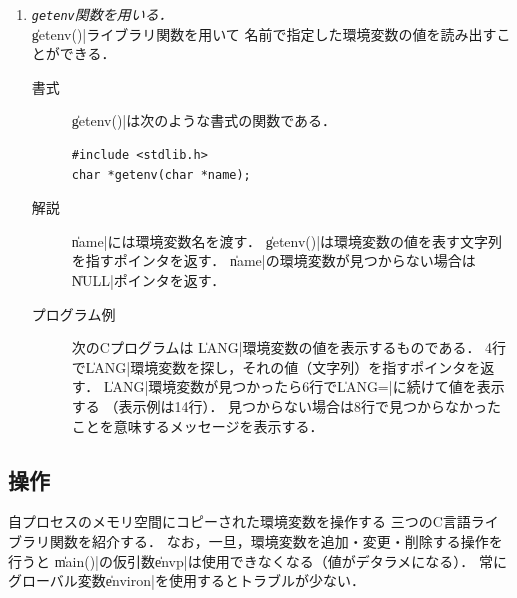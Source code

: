 \begin{enumerate}
\item \emph{\texttt{getenv}関数を用いる．} \\
  \|getenv()|ライブラリ関数を用いて
  名前で指定した環境変数の値を読み出すことができる．

  \begin{description}
  \item [書式] \|getenv()|は次のような書式の関数である．

\begin{lstlisting}[numbers=none]
#include <stdlib.h>
char *getenv(char *name);
\end{lstlisting}

  \item [解説] \|name|には環境変数名を渡す．
    \|getenv()|は環境変数の値を表す文字列を指すポインタを返す．
    \|name|の環境変数が見つからない場合は\|NULL|ポインタを返す．

  \item [プログラム例]
    次のCプログラムは
    \|LANG|環境変数の値を表示するものである．
    4行で\|LANG|環境変数を探し，それの値（文字列）を指すポインタを返す．
    \|LANG|環境変数が見つかったら6行で\|LANG=|に続けて値を表示する
    （表示例は14行）．
    見つからない場合は8行で見つからなかったことを意味するメッセージを表示する．

    
  \end{description}
\end{enumerate}

\subsection{操作}
自プロセスのメモリ空間にコピーされた環境変数を操作する
三つのC言語ライブラリ関数を紹介する．
なお，一旦，環境変数を追加・変更・削除する操作を行うと
\|main()|の仮引数\|envp|は使用できなくなる（値がデタラメになる）．
常にグローバル変数\|environ|を使用するとトラブルが少ない．

